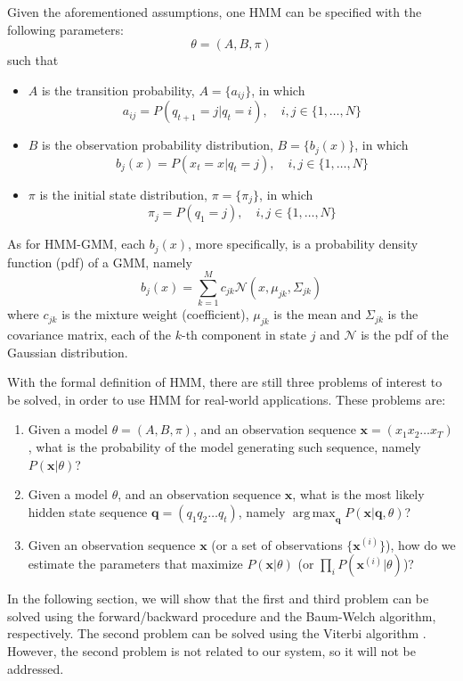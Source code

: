 \documentclass[12pt,final,twoside]{report}
\theoremstyle{plain}
\theoremstyle{definition}
\theoremstyle{remark}
\DeclareMathOperator*{\argmax}{arg\,max}
\begin{document}
Given the aforementioned assumptions, one HMM can be specified with the following parameters:
\[ \theta = (A, B, \pi) \]
such that
\begin{itemize}
  \item $A$ is the transition probability, $A = \{a_{ij}\}$, in which 
    \[ a_{ij} = P(q_{t+1} = j | q_t = i), \quad i,j \in \{1, \dots, N\} \]
  \item $B$ is the observation probability distribution, $B = \{b_j(x)\}$, in which
    \[ b_j(x) = P(x_t = x | q_t = j), \quad i,j \in \{1, \dots, N\} \]
  \item $\pi$ is the initial state distribution, $\pi = \{\pi_j\}$, in which
    \[ \pi_j = P(q_1 = j), \quad i,j \in \{1, \dots, N\} \]
\end{itemize}

As for HMM-GMM, each $b_j(x)$, more specifically, is a probability density function (pdf) of a GMM, namely
\[ b_j(x) = \sum_{k=1}^M c_{jk} \mathcal{N}(x, \mu_{jk}, \Sigma_{jk}) \]
where $c_{jk}$ is the mixture weight (coefficient), $\mu_{jk}$ is the mean and $\Sigma_{jk}$ is the covariance matrix, each of the $k$-th component in state $j$ and $\mathcal{N}$ is the pdf of the Gaussian distribution. 

With the formal definition of HMM, there are still three problems of interest to be solved, in order to use HMM for real-world applications. These problems are:
\begin{enumerate}
  \item Given a model $\theta=(A, B, \pi)$, and an observation sequence $\mathbf{x} = (x_1 x_2 \dots x_T)$, what is the probability of the model generating such sequence, namely $P(\mathbf{x}|\theta)$?
  \item Given a model $\theta$, and an observation sequence $\mathbf{x}$, what is the most likely hidden state sequence $\mathbf{q} = (q_1 q_2 \dots q_t)$, namely $\argmax_{\mathbf{q}}P(\mathbf{x}|\mathbf{q},\theta)$?
  \item Given an observation sequence $\mathbf{x}$ (or a set of observations $\{\mathbf{x}^{(i)}\}$), how do we estimate the parameters that maximize $P(\mathbf{x}|\theta)$ (or $\prod_{i} P(\mathbf{x}^{(i)}|\theta) $)?
\end{enumerate}

In the following section, we will show that the first and third problem can be solved using the forward/backward procedure and the Baum-Welch algorithm, respectively. The second problem can be solved using the Viterbi algorithm \cite{forney_viterbi_1973}. However, the second problem is not related to our system, so it will not be addressed.
\end{document}
